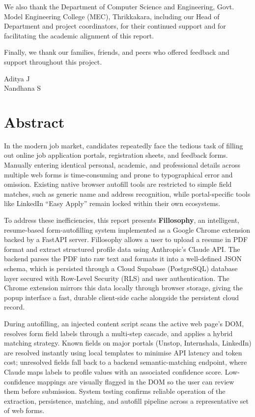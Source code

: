 \documentclass[12pt,a4paper]{report}
\begin{document}
We also thank the Department of Computer Science and Engineering, Govt. Model Engineering College (MEC), Thrikkakara, including our Head of Department and project coordinators, for their continued support and for facilitating the academic alignment of this report.

Finally, we thank our families, friends, and peers who offered feedback and support throughout this project.

\vspace{2.0cm}
\noindent Aditya J \\
\noindent Nandhana S

\chapter*{Abstract}
In the modern job market, candidates repeatedly face the tedious task of filling out online job application portals, registration sheets, and feedback forms. Manually entering identical personal, academic, and professional details across multiple web forms is time-consuming and prone to typographical error and omission. Existing native browser autofill tools are restricted to simple field matches, such as generic name and address recognition, while portal-specific tools like LinkedIn ``Easy Apply'' remain locked within their own ecosystems.

To address these inefficiencies, this report presents \textbf{Fillosophy}, an intelligent, resume-based form-autofilling system implemented as a Google Chrome extension backed by a FastAPI server. Fillosophy allows a user to upload a resume in PDF format and extract structured profile data using Anthropic's Claude API. The backend parses the PDF into raw text and formats it into a well-defined JSON schema, which is persisted through a Cloud Supabase (PostgreSQL) database layer secured with Row-Level Security (RLS) and user authentication. The Chrome extension mirrors this data locally through browser storage, giving the popup interface a fast, durable client-side cache alongside the persistent cloud record.

During autofilling, an injected content script scans the active web page's DOM, resolves form field labels through a multi-step cascade, and applies a hybrid matching strategy. Known fields on major portals (Unstop, Internshala, LinkedIn) are resolved instantly using local templates to minimise API latency and token cost; unresolved fields fall back to a backend semantic-matching endpoint, where Claude maps labels to profile values with an associated confidence score. Low-confidence mappings are visually flagged in the DOM so the user can review them before submission. System testing confirms reliable operation of the extraction, persistence, matching, and autofill pipeline across a representative set of web forms.
\end{document}
